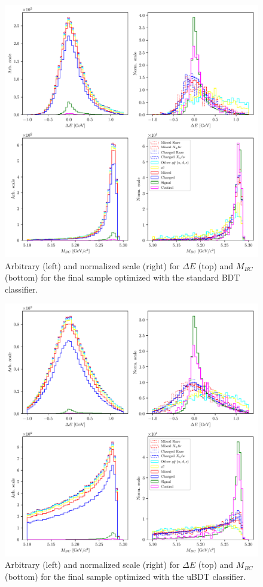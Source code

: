 \begin{figure}[H]
\centering
\captionsetup{width=0.8\linewidth}
\includegraphics[width=\linewidth]{fig/opt_BB}
\caption{Arbitrary (left) and normalized scale (right) for $\Delta E$ (top) and $M_{BC}$ (bottom) for the final sample optimized with the standard BDT classifier.}
\label{fig:opt01c}
\end{figure} 

\begin{figure}[H]
\centering
\captionsetup{width=0.8\linewidth}
\includegraphics[width=\linewidth]{fig/opt_uBB}
\caption{Arbitrary (left) and normalized scale (right) for $\Delta E$ (top) and $M_{BC}$ (bottom) for the final sample optimized with the uBDT classifier.}
\label{fig:opt1dc}
\end{figure} 

